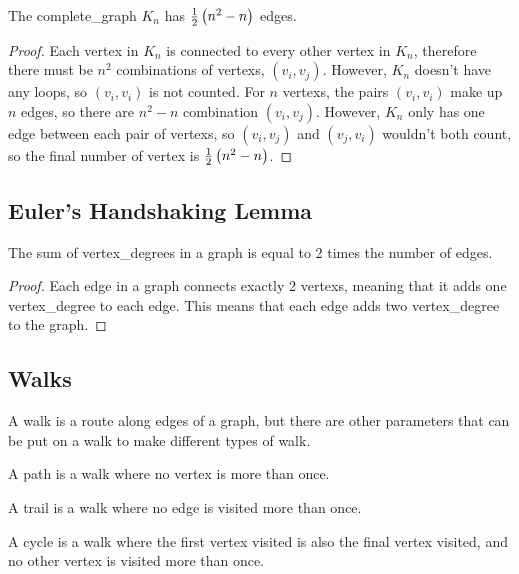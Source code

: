             \begin{theorem}
                The \gls{complete_graph} $K_n$ has $\frac{1}{2}\left(n^2-n\right)$ \glspl{edge}.
            \end{theorem}
            \begin{proof}
                Each \gls{vertex} in $K_n$ is connected to every other \gls{vertex} in $K_n$, therefore there must be $n^2$ combinations of \glspl{vertex}, $(v_i,v_j)$.
                However, $K_n$ doesn't have any \glspl{loop}, so $(v_i,v_i)$ is not counted.
                For $n$ \glspl{vertex}, the pairs $(v_i,v_i)$ make up $n$ \glspl{edge}, so there are $n^2-n$ combination $(v_i,v_j)$.
                However, $K_n$ only has one \gls{edge} between each pair of \glspl{vertex}, so $(v_i,v_j)$ and $(v_j,v_i)$ wouldn't both count, so the final number of \gls{vertex} is $\frac{1}{2}\left(n^2-n\right)$.
            \end{proof}

    \subsection{Euler's Handshaking Lemma}
        \begin{theorem}
            The sum of \glspl{vertex_degree} in a \gls{graph} is equal to 2 times the number of \glspl{edge}.
        \end{theorem}
        \begin{proof}
            Each \gls{edge} in a \gls{graph} connects exactly 2 \glspl{vertex}, meaning that it adds one \gls{vertex_degree} to each \gls{edge}.
            This means that each \gls{edge} adds two \gls{vertex_degree} to the \gls{graph}.
        \end{proof}

    \subsection{Walks}
        A \gls{walk} is a route along \glspl{edge} of a \gls{graph}, but there are other parameters that can be put on a \gls{walk} to make different types of \gls{walk}.

        A \gls{path} is a \gls{walk} where no \gls{vertex} is more than once.

        A \gls{trail} is a \gls{walk} where no \gls{edge} is visited more than once.

        A \gls{cycle} is a \gls{walk} where the first \gls{vertex} visited is also the final \gls{vertex} visited, and no other \gls{vertex} is visited more than once.

